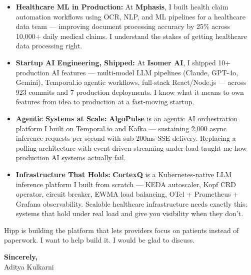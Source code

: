 \documentclass[11pt,letterpaper]{article}
\begin{document}
\begin{itemize}[leftmargin=*, itemsep=3pt, label={\color{HippTeal}\faAngleRight}]
    \item \textbf{Healthcare ML in Production:} At \textbf{Mphasis}, I built health claim automation workflows using OCR, NLP, and ML pipelines for a healthcare data team --- improving document processing accuracy by 25\% across 10,000+ daily medical claims. I understand the stakes of getting healthcare data processing right.

    \item \textbf{Startup AI Engineering, Shipped:} At \textbf{Isomer AI}, I shipped 10+ production AI features --- multi-model LLM pipelines (Claude, GPT-4o, Gemini), Temporal.io agentic workflows, full-stack React/Node.js --- across 923 commits and 7 production deployments. I know what it means to own features from idea to production at a fast-moving startup.

    \item \textbf{Agentic Systems at Scale:} \textbf{AlgoPulse} is an agentic AI orchestration platform I built on Temporal.io and Kafka --- sustaining 2,000 async inference requests per second with sub-200ms SSE delivery. Replacing a polling architecture with event-driven streaming under load taught me how production AI systems actually fail.

    \item \textbf{Infrastructure That Holds:} \textbf{CortexQ} is a Kubernetes-native LLM inference platform I built from scratch --- KEDA autoscaler, Kopf CRD operator, circuit breaker, EWMA load balancing, OTel + Prometheus + Grafana observability. Scalable healthcare infrastructure needs exactly this: systems that hold under real load and give you visibility when they don't.
\end{itemize}

\vspace{6pt}

Hipp is building the platform that lets providers focus on patients instead of paperwork. I want to help build it. I would be glad to discuss.

\vspace{12pt}

\textbf{Sincerely,}\\[8pt]
Aditya Kulkarni
\end{document}
